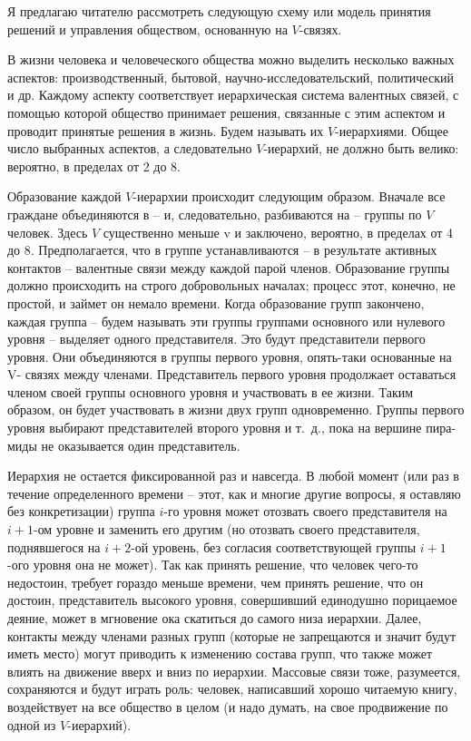 \documentclass{book}
\begin{document}
Я предлагаю читателю рассмотреть следующую схему или модель принятия решений и управления обществом, основан­ную на $V$-связях.

В жизни человека и человеческого общества можно выделить несколько важных аспектов: производственный, бытовой, научно-исследовательский, политический и др. Каждому аспекту соответствует иерархическая система валентных связей, с по­мощью которой общество принимает решения, связанные с этим аспектом и проводит принятые решения в жизнь. Будем назы­вать их $V$-иерархиями. Общее число выбранных аспектов, а сле­довательно  $V$-иерархий, не должно быть велико: вероятно, в пределах от 2 до 8.

Образование каждой $V$-иерархии происходит следующим образом. Вначале все граждане объединяются в -- и, следова­тельно, разбиваются на -- группы по $V$  человек. Здесь $V$  су­щественно меньше v и  заключено, вероятно, в пределах от 4 до 8. Предполагается, что в группе устанавливаются -- в резуль­тате активных контактов -- валентные связи между каждой па­рой членов. Образование группы должно происходить на строго добровольных началах; процесс этот, конечно, не простой, и займет он немало времени. Когда образование групп закончено, каждая группа -- будем называть эти группы группами основ­ного или нулевого уровня -- выделяет одного представителя. Это будут представители первого уровня. Они объединяются в группы первого уровня, опять-таки основанные на V-  связях между членами. Представитель первого уровня продолжает оставаться членом своей группы основного уровня и участво­вать в ее жизни. Таким образом, он будет участвовать в жизни двух групп одновременно. Группы первого уровня выбирают представителей 
второго уровня и т.~д., пока на вершине пира­миды не оказывается один представитель.

Иерархия не остается фиксированной раз и навсегда. В любой момент (или раз в течение определенного времени -- этот, как и многие другие вопросы, я оставляю без конкретизации) группа $i$-го уровня может отозвать своего представителя на $i+1$-ом уровне и заменить его другим (но отозвать своего представителя, поднявшегося на $i+2$-ой уровень, без согласия соответствующей группы $i+1$-ого уровня она не может). Так как принять решение, что человек чего-то недостоин, требует гораздо меньше времени, чем принять решение, что он достоин, представитель высокого уровня, совершивший единодушно порицаемое деяние, может в мгновение ока скатиться до само­го низа иерархии. Далее, контакты между членами разных групп (которые не запрещаются и значит будут иметь место) могут приводить к изменению состава групп, что также может влиять на движение вверх и вниз по иерархии. Массовые связи тоже, разумеется, сохраняются и будут играть роль: человек, написавший хорошо читаемую книгу, воздействует на все об­щество в целом (и надо 
думать, на свое продвижение по одной из $V$-иерархий).
\end{document}
